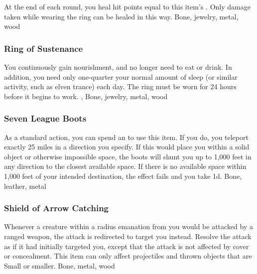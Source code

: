 At the end of each round, you heal hit points equal to this item's .
Only damage taken while wearing the ring can be healed in this way.
 
 Bone, jewelry, metal, wood
\lowercase{\hypertarget{item:Ring of Sustenance}{}}\label{item:Ring of Sustenance}
\hypertarget{item:Ring of Sustenance}{\subsubsection{Ring of Sustenance\hfill{}}}
You continuously gain nourishment, and no longer need to eat or drink.
In addition, you need only one-quarter your normal amount of sleep (or similar activity, such as elven trance) each day.
The ring must be worn for 24 hours before it begins to work.
 , 
 Bone, jewelry, metal, wood
\lowercase{\hypertarget{item:Seven League Boots}{}}\label{item:Seven League Boots}
\hypertarget{item:Seven League Boots}{\subsubsection{Seven League Boots\hfill{}}}
As a standard action, you can spend an  to use this item.
If you do, you teleport exactly 25 miles in a direction you specify.
If this would place you within a solid object or otherwise impossible space, the boots will shunt you up to 1,000 feet in any direction to the closest available space.
If there is no available space within 1,000 feet of your intended destination, the effect fails and you take  \minus1d.
 
 Bone, leather, metal
\lowercase{\hypertarget{item:Shield of Arrow Catching}{}}\label{item:Shield of Arrow Catching}
\hypertarget{item:Shield of Arrow Catching}{\subsubsection{Shield of Arrow Catching\hfill{}}}
Whenever a creature within a \areamed radius emanation from you would be attacked by a ranged weapon, the attack is redirected to target you instead.
Resolve the attack as if it had initially targeted you, except that the attack is not affected by cover or concealment.
This item can only affect projectiles and thrown objects that are Small or smaller.
 
 Bone, metal, wood
\lowercase{\hypertarget{item:Shield of Arrow Catching, Greater}{}}\label{item:Shield of Arrow Catching, Greater}
